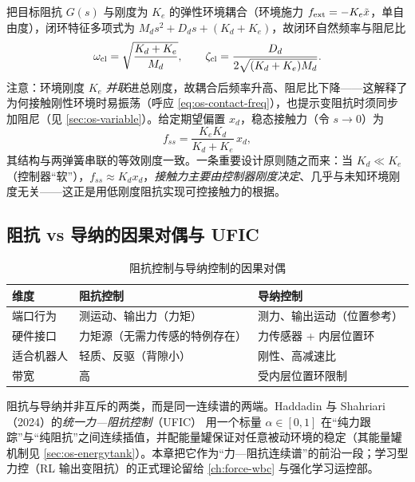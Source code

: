 把目标阻抗 $G(s)$ 与刚度为 $K_e$ 的弹性环境耦合（环境施力 $f_{\rm ext}=-K_e\tilde x$，单自由度），闭环特征多项式为 $M_d s^2+D_d s+(K_d+K_e)$，故闭环自然频率与阻尼比
\begin{equation}
  \omega_{\rm cl}=\sqrt{\frac{K_d+K_e}{M_d}},\qquad
  \zeta_{\rm cl}=\frac{D_d}{2\sqrt{(K_d+K_e)M_d}}.
  \label{eq:os-coupled-freq}
\end{equation}
注意：环境刚度 $K_e$ \emph{并联}进总刚度，故耦合后频率升高、阻尼比下降——这解释了为何接触刚性环境时易振荡（呼应 \cref{eq:os-contact-freq}），也提示变阻抗时须同步加阻尼（见 \cref{sec:os-variable}）。给定期望偏置 $x_d$，稳态接触力（令 $s\to0$）为
\begin{equation}
  f_{ss}=\frac{K_e K_d}{K_d+K_e}\,x_d,
  \label{eq:os-fss}
\end{equation}
其结构与两弹簧串联的等效刚度一致。一条重要设计原则随之而来：当 $K_d\ll K_e$（控制器“软”），$f_{ss}\approx K_d x_d$，\emph{接触力主要由控制器刚度决定}、几乎与未知环境刚度无关——这正是用低刚度阻抗实现可控接触力的根据。

\subsection{阻抗 vs 导纳的因果对偶与 UFIC}
\label{sec:os-causality}

\begin{table}[H]\centering\small
\caption{阻抗控制与导纳控制的因果对偶}
\label{tab:os-imp-adm}
\begin{tabular}{p{} p{} p{}}
\toprule
维度 & 阻抗控制 & 导纳控制 \\
\midrule
端口行为 & 测运动、输出力（力矩） & 测力、输出运动（位置参考） \\
硬件接口 & 力矩源（无需力传感的特例存在） & 力传感器 + 内层位置环 \\
适合机器人 & 轻质、反驱（背隙小） & 刚性、高减速比 \\
带宽 & 高 & 受内层位置环限制 \\
\bottomrule
\end{tabular}
\end{table}

阻抗与导纳并非互斥的两类，而是同一连续谱的两端。Haddadin 与 Shahriari（2024）的\emph{统一力—阻抗控制}（UFIC）\cite{shahriari2024unified} 用一个标量 $\alpha\in[0,1]$ 在“纯力跟踪”与“纯阻抗”之间连续插值，并配能量罐保证对任意被动环境的稳定（其能量罐机制见 \cref{sec:os-energytank}）。本章把它作为“力—阻抗连续谱”的前沿一段；学习型力控（RL 输出变阻抗）的正式理论留给 \cref{ch:force-wbc} 与强化学习运控部。

